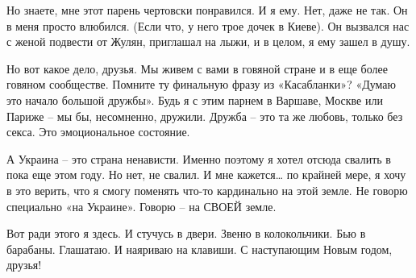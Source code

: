 Но знаете, мне этот парень чертовски понравился. И я ему. Нет, даже не так. Он
в меня просто влюбился. (Если что, у него трое дочек в Киеве). Он вызвался нас
с женой подвести от Жулян, приглашал на лыжи, и в целом, я ему зашел в душу.

Но вот какое дело, друзья. Мы живем с вами в говяной стране и в еще более
говяном сообществе. Помните ту финальную фразу из «Касабланки»? «Думаю это
начало большой дружбы». Будь я с этим парнем в Варшаве, Москве или Париже – мы
бы, несомненно, дружили. Дружба – это та же любовь, только без секса. Это
эмоциональное состояние.

А Украина – это страна ненависти. Именно поэтому я хотел отсюда свалить в пока
еще этом году. Но нет, не свалил. И мне кажется… по крайней мере, я хочу в это
верить, что я смогу поменять что-то кардинально на этой земле. Не говорю
специально «на Украине». Говорю – на СВОЕЙ земле.

Вот ради этого я здесь. И стучусь в двери. Звеню в колокольчики. Бью в
барабаны. Глашатаю. И наяриваю на клавиши. С наступающим Новым годом, друзья!

